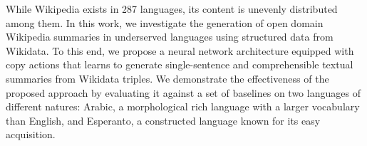 While Wikipedia exists in 287 languages, its content is unevenly distributed among them. In this work, we investigate the generation of open domain Wikipedia summaries in underserved languages using structured data from Wikidata. To this end, we propose a neural network architecture equipped with copy actions that learns to generate single-sentence and comprehensible textual summaries from Wikidata triples. We demonstrate the effectiveness of the proposed approach by evaluating it against a set of baselines on two languages of different natures: Arabic, a morphological rich language with a larger vocabulary than English, and Esperanto, a constructed language known for its easy acquisition.
